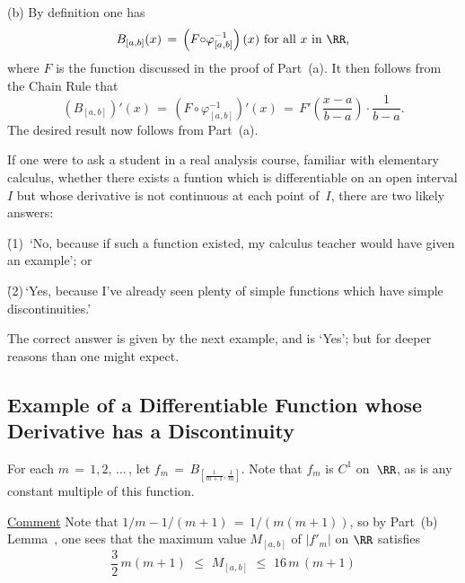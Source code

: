 {{\V

        (b) By definition one has
        \begin{displaymath}
        B_{[a,b]}(x) \,=\, \left(F{\circ}{\varphi}^{-1}_{[a,b]}\right)(x) \mbox{ for all $x$ in ${\RR}$},
        \end{displaymath}
    where $F$ is the function discussed in the proof of Part~(a). It then follows from the Chain Rule that
        \begin{displaymath}
        (B_{[a,b]})'(x) \,=\,\left(F{\circ}{\varphi}^{-1}_{[a,b]}\right)'(x) \,=\, F'\left(\frac{x-a}{b-a}\right){\cdot}\frac{1}{b-a}.
        \end{displaymath}
    The desired result now follows from Part~(a). \Q

}%

\VV

        If one were to ask a student in a real analysis course, familiar with elementary calculus,
    whether there exists a funtion which is differentiable on an open interval $I$ but whose derivative is not continuous at each point of~$I$,
    there are two likely answers:

\VA

         \h (1)\, `No, because if such a function existed, my calculus teacher would have given an example'; or

        \h (2)\,`Yes, because I've already seen plenty of simple functions which have simple discontinuities.'

\VA

        The correct answer is given by the next example, and is `Yes'; but for deeper reasons than one might expect.

\V


            \subsection{\small{\bf Example of a Differentiable Function whose Derivative has a Discontinuity}}
            \label{ExampE35.130}

\V

        For each $m \,=\, 1,2,\,{\ldots}\,$, let ${\displaystyle f_{m} \,=\, B_{\left[\frac{1}{m+1},\frac{1}{m}\right]}}$.
    Note that $f_{m}$ is $C^{1}$ on~${\RR}$, as is any constant multiple of this function.

        \underline{Comment} Note that $1/m - 1/(m+1) \,=\, 1/(m(m+1))$, so by Part~(b) Lemma~,
    one sees that the maximum value $M_{[a,b]}$ of $|f'_{m}|$ on ${\RR}$ satisfies
        \begin{displaymath}
        \frac{3}{2}\,m(m+1)\,\,{\leq}\,\,M_{[a,b]}\,\,{\leq}\,\, 16\,m\,(m+1)
        \end{displaymath}

}
